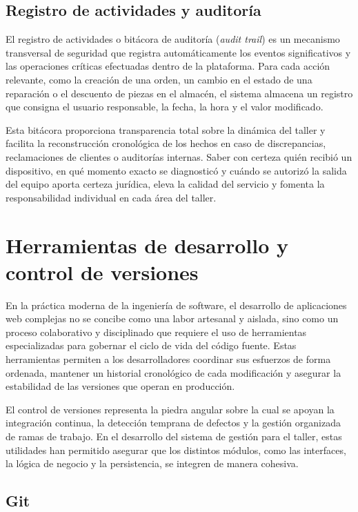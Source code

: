 \subsection{Registro de actividades y auditoría}

El registro de actividades o bitácora de auditoría (\textit{audit trail}) es un mecanismo transversal de seguridad que registra automáticamente los eventos significativos y las operaciones críticas efectuadas dentro de la plataforma. Para cada acción relevante, como la creación de una orden, un cambio en el estado de una reparación o el descuento de piezas en el almacén, el sistema almacena un registro que consigna el usuario responsable, la fecha, la hora y el valor modificado.

Esta bitácora proporciona transparencia total sobre la dinámica del taller y facilita la reconstrucción cronológica de los hechos en caso de discrepancias, reclamaciones de clientes o auditorías internas. Saber con certeza quién recibió un dispositivo, en qué momento exacto se diagnosticó y cuándo se autorizó la salida del equipo aporta certeza jurídica, eleva la calidad del servicio y fomenta la responsabilidad individual en cada área del taller.

\section{Herramientas de desarrollo y control de versiones}

En la práctica moderna de la ingeniería de software, el desarrollo de aplicaciones web complejas no se concibe como una labor artesanal y aislada, sino como un proceso colaborativo y disciplinado que requiere el uso de herramientas especializadas para gobernar el ciclo de vida del código fuente. Estas herramientas permiten a los desarrolladores coordinar sus esfuerzos de forma ordenada, mantener un historial cronológico de cada modificación y asegurar la estabilidad de las versiones que operan en producción.

El control de versiones representa la piedra angular sobre la cual se apoyan la integración continua, la detección temprana de defectos y la gestión organizada de ramas de trabajo. En el desarrollo del sistema de gestión para el taller, estas utilidades han permitido asegurar que los distintos módulos, como las interfaces, la lógica de negocio y la persistencia, se integren de manera cohesiva.

\subsection{Git}

